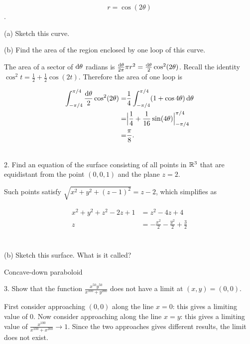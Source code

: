 \documentclass[12pt]{article}
\begin{document}
$$
r = \cos(2\theta)
$$.

(a) Sketch this curve.

(b) Find the area of the region enclosed by one loop of this curve.\\

\begin{mdframed}
The area of a sector of $\operatorname{\text{d}\theta}$ radians is $\frac{\operatorname{\text{d}\theta}}{2\pi}\pi r^2 = \frac{\operatorname{\text{d}\theta}}{2}\cos^2(2\theta)$. Recall the identity $\cos^2 t = \frac{1}{2} + \frac{1}{2}\cos(2t)$. Therefore the area of one loop is

\begin{align*}
  \int_{-\pi/4}^{\pi/4} \frac{\operatorname{\text{d}\theta}}{2}\cos^2(2\theta)
  =&\frac{1}{4}\int_{-\pi/4}^{\pi/4} (1 + \cos 4\theta) \operatorname{\text{d}\theta} \\
  =& \Big|\frac{1}{4} + \frac{1}{16}\sin(4\theta)\Big|_{-\pi/4}^{\pi/4} \\
  =& \frac{\pi}{8}.
\end{align*}

\end{mdframed}~\\

2. Find an equation of the surface consisting of all points in $\mathbb{R}^3$ that are equidistant
from the point $(0, 0, 1)$ and the plane $z = 2$.\\

\begin{mdframed}
Such points satisfy $\sqrt{x^2 + y^2 + (z - 1)^2} = z - 2$, which simplifies as

\begin{align*}
x^2 + y^2 + z^2 - 2z + 1 &= z^2 - 4z + 4 \\
z &= -\frac{x^2}{2} -\frac{y^2}{2} + \frac{3}{2} \\
\end{align*}

\end{mdframed}~\\

(b) Sketch this surface. What is it called?

\begin{mdframed}
Concave-down paraboloid
\end{mdframed}

3. Show that the function $\frac{x^{50}y^{50}}{x^{100} + y^{200}}$ does not
have a limit at $(x, y) = (0, 0)$.

\begin{mdframed}
  First consider approaching $(0, 0)$ along the line $x=0$: this gives a limiting value of 0.
  Now consider approaching along the line $x=y$: this gives a limiting value of $\frac{x^{100}}{x^{100} + x^{200}} \to 1$.
  Since the two approaches gives different results, the limit does not exist.
\end{mdframed}~\\
\end{document}
